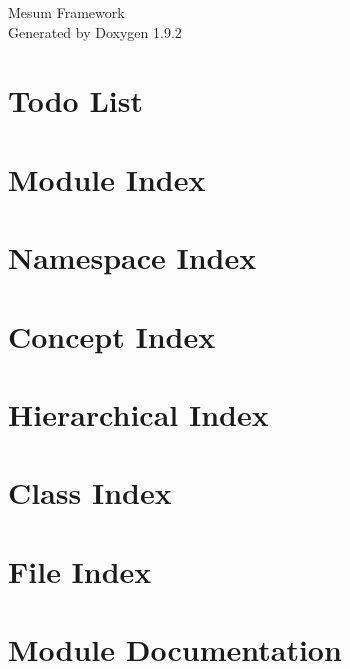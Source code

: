 \documentclass[twoside]{book}
\newcommand{\+}{\discretionary{\mbox{\scriptsize$\hookleftarrow$}}{}{}}
\newcommand{\clearemptydoublepage}{%
    \newpage{\pagestyle{empty}\cleardoublepage}%
  }
\begin{document}
  \raggedbottom
    \hypersetup{pageanchor=false,
                bookmarksnumbered=true,
                pdfencoding=unicode
               }
  \begin{titlepage}
  \vspace*{7cm}
  \begin{center}%
  {\Large Mesum Framework}\\
  \vspace*{1cm}
  {\large Generated by Doxygen 1.9.2}\\
  \end{center}
  \end{titlepage}
  \clearemptydoublepage
  \tableofcontents
  \clearemptydoublepage
  \hypersetup{pageanchor=true}
\chapter{Todo List}
\label{todo}

\chapter{Module Index}

\chapter{Namespace Index}

\chapter{Concept Index}

\chapter{Hierarchical Index}

\chapter{Class Index}

\chapter{File Index}

\chapter{Module Documentation}




\end{document}
